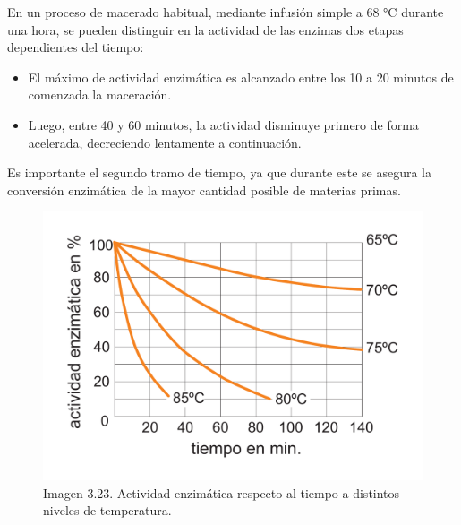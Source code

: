 \begin{itemize}
    	            \par En un proceso de macerado habitual, mediante infusión simple a 68 °C durante una hora, se pueden distinguir en la actividad de las enzimas dos etapas dependientes del tiempo:
    	           
    	            
    	                \begin{itemize}
    	                    \item El máximo de actividad enzimática es alcanzado entre los 10 a 20 minutos de comenzada la maceración.
    	                    
    	                    \item Luego, entre 40 y 60 minutos, la actividad disminuye primero de forma acelerada, decreciendo lentamente a continuación.
    	               
    	                \end{itemize}
    	                
    	           \par Es importante el segundo tramo de tiempo, ya que durante este se asegura la conversión enzimática de la mayor cantidad posible de materias primas.
    	                
    	                \begin{figure} [hb]		                                                       \centerline{\includegraphics[scale=0.4]{duracion_amilasas.pdf}}
		                    \caption{Imagen 3.23. Actividad enzimática respecto al tiempo a distintos niveles de temperatura. \cite{Kunze}}
	                        \label{DuracionEnzimas}
    	                \end{figure}
    	                

\end{itemize}
